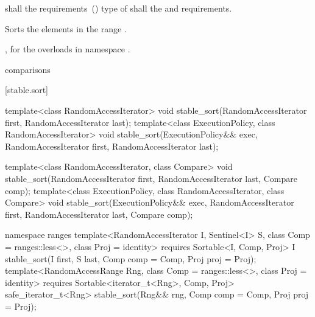 \begin{itemdescr}
\pnum
\requires
{}
 shall  the
 requirements~() type of  shall  the
 and
 requirements.

\pnum
\effects
Sorts the elements in the range
.

\begin{addedblock}
\pnum
\returns {}, for the overloads in namespace .
\end{addedblock}

\pnum
\complexity
{} 
comparisons
\end{itemdescr}


[stable.sort]{}

%
\begin{itemdecl}
template<class RandomAccessIterator>
  void stable_sort(RandomAccessIterator first, RandomAccessIterator last);
template<class ExecutionPolicy, class RandomAccessIterator>
  void stable_sort(ExecutionPolicy&& exec,
                   RandomAccessIterator first, RandomAccessIterator last);

template<class RandomAccessIterator, class Compare>
  void stable_sort(RandomAccessIterator first, RandomAccessIterator last,
                   Compare comp);
template<class ExecutionPolicy, class RandomAccessIterator, class Compare>
  void stable_sort(ExecutionPolicy&& exec,
                   RandomAccessIterator first, RandomAccessIterator last,
                   Compare comp);
\end{itemdecl}
\begin{addedblock}
\begin{itemdecl}
namespace ranges {
  template<RandomAccessIterator I, Sentinel<I> S, class Comp = ranges::less<>,
      class Proj = identity>
    requires Sortable<I, Comp, Proj>
    I stable_sort(I first, S last, Comp comp = Comp{}, Proj proj = Proj{});
  template<RandomAccessRange Rng, class Comp = ranges::less<>, class Proj = identity>
    requires Sortable<iterator_t<Rng>, Comp, Proj>
    safe_iterator_t<Rng>
      stable_sort(Rng&& rng, Comp comp = Comp{}, Proj proj = Proj{});
}
\end{itemdecl}
\end{addedblock}

